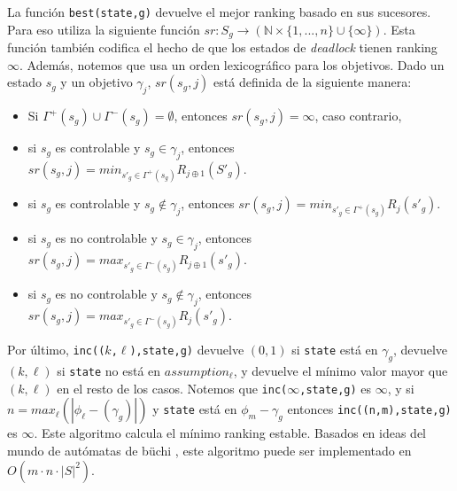 La función \texttt{best(state,g)} devuelve el mejor ranking basado en sus sucesores. Para eso utiliza la siguiente
función $sr : S_g \rightarrow (\mathbb{N} \times \{1,...,n\} \cup \{\infty\})$. Esta función también codifica el hecho
de que los estados de \emph{deadlock} tienen ranking $\infty$. Además, notemos que usa un orden lexicográfico para los
objetivos. Dado un estado $s_g$ y un objetivo $\gamma_j$, $sr(s_g,j)$ está definida de la siguiente manera:

\begin{itemize}
\item Si $\Gamma^+(s_g) \cup \Gamma^-(s_g) = \emptyset$, entonces $sr(s_g,j) = \infty$, caso contrario,
\item si $s_g$ es controlable y $s_g \in \gamma_j$, entonces $sr(s_g,j) = min_{s'_g \in \Gamma^+(s_g)} R_{j \oplus
1}(S'_g)$.
\item si $s_g$ es controlable y $s_g \notin \gamma_j$, entonces $sr(s_g,j) = min_{s'_g \in \Gamma^+(s_g)} R_j(s'_g)$.
\item si $s_g$ es no controlable y $s_g \in \gamma_j$, entonces $sr(s_g,j) = max_{s'_g \in \Gamma^-(s_g)} R_{j \oplus
1}(s'_g)$.
\item si $s_g$ es no controlable y $s_g \notin \gamma_j$, entonces $sr(s_g,j) = max_{s'_g \in \Gamma^-(s_g)} R_j(s'_g)$.
\end{itemize}

Por último, \texttt{inc(($k$,$\ell$),state,g)} devuelve $(0,1)$ si \texttt{state} está en $\gamma_g$, devuelve $(k,\ell)$ si
\texttt{state} no está en \texttt{$assumption_\ell$}, y devuelve el mínimo valor mayor que $(k,\ell)$ en el resto de los
casos. Notemos que \texttt{inc($\infty$,state,g)} es $\infty$, y si $n = max_\ell(|\phi_\ell-(\gamma_g)|)$ y
\texttt{state} está en $\phi_m-\gamma_g$ entonces \texttt{inc((n,m),state,g)} es $\infty$. Este algoritmo calcula el
mínimo ranking estable. Basados en ideas del mundo de autómatas de büchi \cite{doi:10.1137/S0097539703420675,
PitermanAndJuvekar}, este algoritmo puede ser implementado
en $O(m \cdot n \cdot |S|^2)$.
